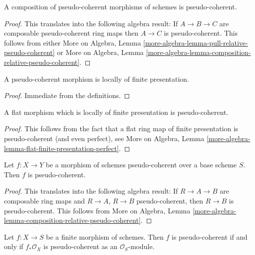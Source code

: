 \begin{lemma}
\label{lemma-composition-pseudo-coherent}
A composition of pseudo-coherent morphisms of schemes is
pseudo-coherent.
\end{lemma}

\begin{proof}
This translates into the following algebra result:
If $A \to B \to C$ are composable pseudo-coherent ring maps
then $A \to C$ is pseudo-coherent. This follows from either
More on Algebra,
Lemma \ref{more-algebra-lemma-pull-relative-pseudo-coherent}
or
More on Algebra,
Lemma \ref{more-algebra-lemma-composition-relative-pseudo-coherent}.
\end{proof}

\begin{lemma}
\label{lemma-pseudo-coherent-finite-presentation}
A pseudo-coherent morphism is locally of finite presentation.
\end{lemma}

\begin{proof}
Immediate from the definitions.
\end{proof}

\begin{lemma}
\label{lemma-flat-finite-presentation-pseudo-coherent}
A flat morphism which is locally of finite presentation is pseudo-coherent.
\end{lemma}

\begin{proof}
This follows from the fact that a flat ring map of finite presentation is
pseudo-coherent (and even perfect), see
More on Algebra,
Lemma \ref{more-algebra-lemma-flat-finite-presentation-perfect}.
\end{proof}

\begin{lemma}
\label{lemma-permanence-pseudo-coherent}
Let $f : X \to Y$ be a morphism of schemes pseudo-coherent
over a base scheme $S$. Then $f$ is pseudo-coherent.
\end{lemma}

\begin{proof}
This translates into the following algebra result:
If $R \to A \to B$ are composable ring maps
and $R \to A$, $R \to B$ pseudo-coherent, then
$R \to B$ is pseudo-coherent. This follows from
More on Algebra,
Lemma \ref{more-algebra-lemma-composition-relative-pseudo-coherent}.
\end{proof}

\begin{lemma}
\label{lemma-finite-pseudo-coherent}
Let $f : X \to S$ be a finite morphism of schemes.
Then $f$ is pseudo-coherent if and only if $f_*\mathcal{O}_X$
is pseudo-coherent as an $\mathcal{O}_S$-module.
\end{lemma}

